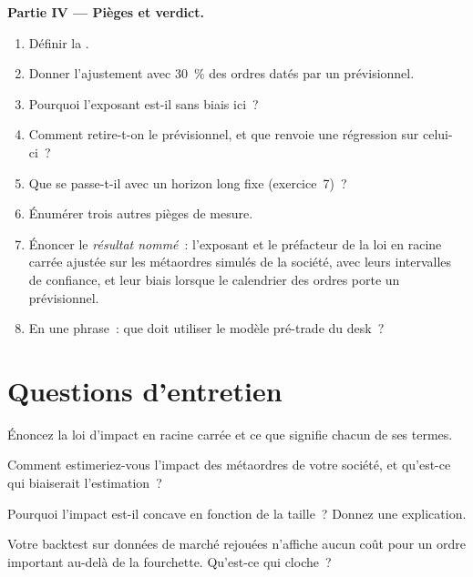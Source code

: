 \begin{problem}
\medskip\noindent\textbf{Partie IV --- Pièges et verdict.}
\begin{enumerate}[resume]
\item Définir la .
\item Donner l'ajustement avec 30~\% des ordres datés par un prévisionnel.
\item Pourquoi l'exposant est-il sans biais ici~?
\item Comment retire-t-on le prévisionnel, et que renvoie une régression sur celui-ci~?
\item Que se passe-t-il avec un horizon long fixe (exercice~7)~?
\item Énumérer trois autres pièges de mesure.
\item Énoncer le \emph{résultat nommé}~: l'exposant et le préfacteur de la loi en racine carrée ajustée sur les métaordres simulés de la société, avec leurs intervalles de confiance,
et leur biais lorsque le calendrier des ordres porte un prévisionnel.
\item En une phrase~: que doit utiliser le modèle pré-trade du desk~?
\end{enumerate}
\end{problem}

\section{Questions d'entretien}

\begin{interviewq}\label{iq:mx:the-empirics-of-price-impact:1}
Énoncez la loi d'impact en racine carrée et ce que signifie chacun de ses termes.
\end{interviewq}

\begin{interviewq}\label{iq:mx:the-empirics-of-price-impact:2}
Comment estimeriez-vous l'impact des métaordres de votre société, et qu'est-ce qui biaiserait l'estimation~?
\end{interviewq}

\begin{interviewq}\label{iq:mx:the-empirics-of-price-impact:3}
Pourquoi l'impact est-il concave en fonction de la taille~? Donnez une explication.
\end{interviewq}

\begin{interviewq}\label{iq:mx:the-empirics-of-price-impact:4}
Votre backtest sur données de marché rejouées n'affiche aucun coût pour un ordre important au-delà de la fourchette. Qu'est-ce qui cloche~?
\end{interviewq}

